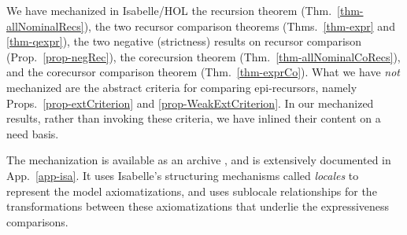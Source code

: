 We have mechanized in Isabelle/HOL %
	the recursion theorem (Thm.~\ref{thm-allNominalRecs}), 
	the two recursor comparison theorems (Thms.~\ref{thm-expr} and \ref{thm-qexpr}), 
	 the two negative (strictness) results on recursor comparison (Prop.~\ref{prop-negRec}), 
	 the corecursion theorem (Thm.~\ref{thm-allNominalCoRecs}), and 
	the corecursor comparison theorem (Thm.~\ref{thm-exprCo}). 
%
What we have \emph{not} mechanized are the abstract criteria for comparing epi-recursors, namely  
Props.~\ref{prop-extCriterion} and \ref{prop-WeakExtCriterion}.
 In our mechanized results, rather than invoking these criteria, we have inlined their content on a need basis. 

The %
mechanization is available as an archive \cite{isa-nomialEpiRec},
and is extensively documented  
in App.~\ref{app-isa}.   
It uses Isabelle's structuring mechanisms called \emph{locales} \cite{DBLP:conf/tphol/KammullerWP99,DBLP:journals/jar/Ballarin14} %
to represent the 
model axiomatizations, and uses sublocale relationships for the transformations between these axiomatizations that underlie the 
expressiveness comparisons. %
%

